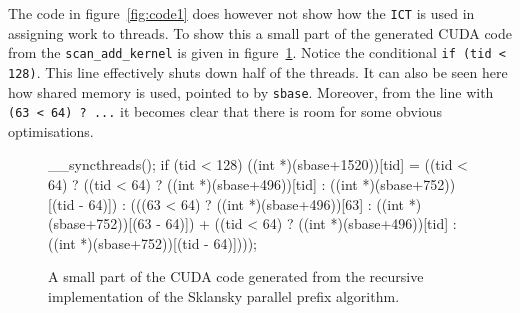 The code in figure~\ref{fig:code1} does however not show how the {\tt ICT} 
is used in assigning work to threads. To show this  a small part of the 
generated CUDA code from the {\tt scan\_add\_kernel} is given in 
figure~\ref{fig:code2}. Notice the conditional {\tt if (tid < 128)}. 
This line effectively shuts down half of the threads. It can also be seen 
here how shared memory is used, pointed to by {\tt sbase}. Moreover, from the 
line with {\tt (63 < 64) ? ...} it becomes clear that there is room for some
obvious optimisations. 

 

\begin{figure}
\begin{code} 
 __syncthreads();
 if (tid < 128){
   ((int *)(sbase+1520))[tid] = ((tid < 64) ?
   ((tid < 64) ?
   ((int *)(sbase+496))[tid] : 
   ((int *)(sbase+752))[(tid - 64)]) : 
   (((63 < 64) ?
   ((int *)(sbase+496))[63] : 
   ((int *)(sbase+752))[(63 - 64)]) + ((tid < 64) ?
   ((int *)(sbase+496))[tid] : 
   ((int *)(sbase+752))[(tid - 64)])));
 }
\end{code} 
\caption{A small part of the CUDA code generated from the recursive implementation of the Sklansky parallel prefix algorithm.}
\label{fig:code2}
\end{figure}
\noindent

 


\FloatBarrier
